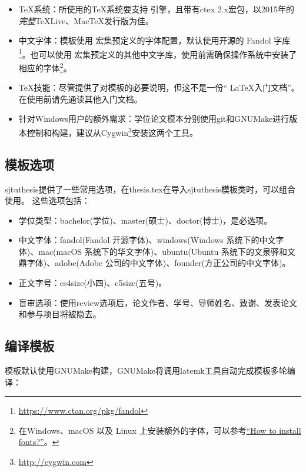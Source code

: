 \begin{itemize}[noitemsep,topsep=0pt,parsep=0pt,partopsep=0pt]
	\item {\TeX}系统：所使用的{\TeX}系统要支持 \XeTeX 引擎，且带有ctex 2.x宏包，以2015年的\emph{完整}TeXLive、MacTeX发行版为佳。
	\item 中文字体：模板使用 \CTeX 宏集预定义的字体配置，默认使用开源的 Fandol 字库\footnote{\url{https://www.ctan.org/pkg/fandol}}。也可以使用 \CTeX 宏集预定义的其他中文字库，使用前需确保操作系统中安装了相应的字体\footnote{在Windows、macOS 以及 Linux 上安装额外的字体，可以参考\href{https://www.searchfreefonts.com/articles/how-to-install-fonts.htm}{“How to install fonts?”}。}。
	\item TeX技能：尽管提供了对模板的必要说明，但这不是一份“ \LaTeX 入门文档”。在使用前请先通读其他入门文档。
	\item 针对Windows用户的额外需求：学位论文模本分别使用git和GNUMake进行版本控制和构建，建议从Cygwin\footnote{\url{http://cygwin.com}}安装这两个工具。
\end{itemize}

\subsection{模板选项}
\label{sec:thesisoption}

sjtuthesis提供了一些常用选项，在thesis.tex在导入sjtuthesis模板类时，可以组合使用。
这些选项包括：

\begin{itemize}[noitemsep,topsep=0pt,parsep=0pt,partopsep=0pt]
\item 学位类型：bachelor(学位)、master(硕士)、doctor(博士)，是必选项。
\item 中文字体：fandol(Fandol 开源字体)、windows(Windows 系统下的中文字体)、mac(macOS 系统下的华文字体)、ubuntu(Ubuntu 系统下的文泉驿和文鼎字体)、adobe(Adobe 公司的中文字体)、founder(方正公司的中文字体)。
\item 正文字号：cs4size(小四)、c5size(五号)。
\item 盲审选项：使用review选项后，论文作者、学号、导师姓名、致谢、发表论文和参与项目将被隐去。
\end{itemize}

\subsection{编译模板}
\label{sec:process}

模板默认使用GNUMake构建，GNUMake将调用latemk工具自动完成模板多轮编译：

